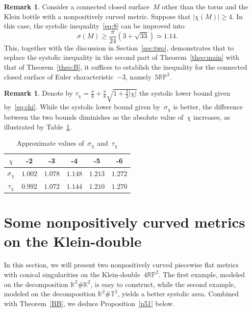 \documentclass[12pt,reqno]{amsart}
\theoremstyle{definition}
\newtheorem{remark}[theorem]{Remark}
\numberwithin{equation}{section}
\newcommand\T {{\mathbb T}}
\newcommand\K {{\mathbb K}}
\newcommand{\RP}{{\mathbb R\mathbb P}}
\numberwithin{equation}{section}
\begin{document}
\forget
\begin{remark}
Consider a connected closed surface~$M$ other than the torus and the Klein bottle with a nonpositively curved metric.
Suppose that $|\chi(M)| \geq 4$.
In this case, the systolic inequality~\eqref{eq:8} can be improved into
\[
\sigma(M) \geq \frac{\pi}{24} (3 +\sqrt{33}) \simeq 1.14.
\]
This, together with the discussion in Section~\ref{sec:two}, demonstrates that to replace the systolic inequality in the second part of Theorem~\ref{theo:main} with that of Theorem~\ref{theo:B}, it suffices to establish the inequality for the connected closed surface of Euler characteristic~$-3$, namely~$5 \RP^2$.
\end{remark}
\forgotten

\begin{remark}
Denote by $\tau_\chi = \frac{\pi}{8} + \frac{\pi}{8} \sqrt{1 + \frac{2}{3} | \chi|}$ the systolic lower bound given by~\eqref{eq:chi}.
While the systolic lower bound given by~$\sigma_\chi$ is better, the difference between the two bounds diminishes as the absolute value of~$\chi$ increases, as illustrated by Table~\ref{table}.

\begin{table}[htbp!]
\begin{tabular}{|c|c|c|c|c|c|}
\hline
$\chi$ & -2 & -3 & -4 & -5 & -6 \\
\hline
$\sigma_\chi$ & $1.002$ & $1.078$ & $1.148$ & $1.213$ & $1.272$ \\
\hline
$\tau_\chi$ & $0.992$ & $1.072$ & $1.144$ & $1.210$ & $1.270$ \\
\hline
\end{tabular}
\medskip
\caption{Approximate values of~$\sigma_\chi$ and~$\tau_\chi$} \label{table}
\end{table}
\end{remark}

\section{Some nonpositively curved metrics on the Klein-double}

In this section, we will present two nonpositively curved piecewise
flat metrics with conical singularities on the Klein-double~$4\RP^2$.
The first example, modeled on the decomposition $\K^2 \# \K^2$, is
easy to construct, while the second example, modeled on the
decomposition $\K^2 \# \T^2$, yields a better systolic area.  Combined
with Theorem~\ref{BB}, we deduce Proposition~\ref{p51} below.
\end{document}
